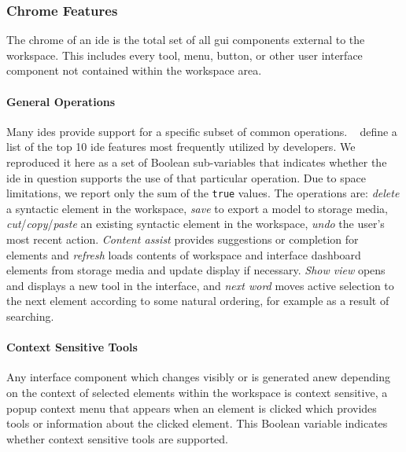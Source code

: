 \subsubsection{Chrome Features} \label{subsubsec:chrome}

The chrome of an \ac{ide} is the total set of all \acf{gui} components
external to the workspace. This includes every tool, menu, button, or other
user interface component not contained within the workspace area.


\paragraph{General Operations}
Many \acp{ide} provide support for a specific subset of common operations.
\citeauthor{murphy2006}~\cite{murphy2006} define a list of the top 10 \ac{ide} features most frequently utilized by developers.
We reproduced it here as a set of Boolean sub-variables that indicates whether the \ac{ide} in question supports the use of that particular operation.
Due to space limitations, we report only the sum of the \texttt{true} values.
The operations are: \emph{delete} a syntactic element in the workspace,
\emph{save} to export a model to storage media,
\emph{cut}/\emph{copy}/\emph{paste} an existing syntactic element in the workspace,
\emph{undo} the user's most recent action.
\emph{Content assist} provides suggestions or completion for elements
and
\emph{refresh} loads contents of workspace and interface dashboard elements from storage media and update display if necessary.
\emph{Show view} opens and displays a new tool in the interface,
and
\emph{next word} moves active selection to the next element according to some natural ordering, for example as a result of searching.


\paragraph{Context Sensitive Tools}
Any interface component which changes visibly or is generated anew
depending on the context of selected elements within the workspace is
context sensitive, \eg a popup context menu that appears when an element is
clicked which provides tools or information about the clicked element.
This Boolean variable indicates whether context sensitive tools are
supported.


